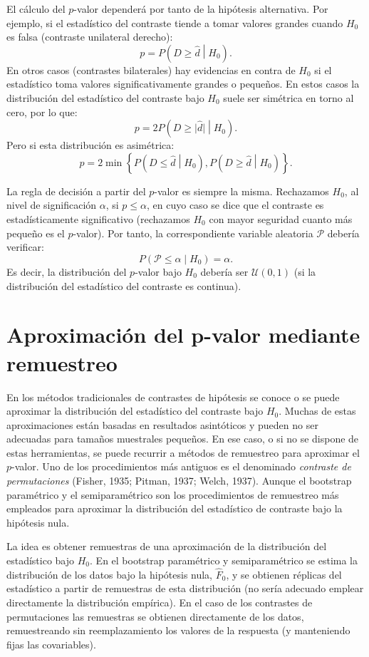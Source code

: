 \documentclass[
]{book}
\theoremstyle{break}
\theoremstyle{nonumberplain}
\begin{document}
El cálculo del \(p\)-valor dependerá por tanto de la hipótesis alternativa.
Por ejemplo, si el estadístico del contraste tiende a tomar valores
grandes cuando \(H_0\) es falsa (contraste unilateral derecho):
\[p = P\left( D \geq \hat{d} \middle| H_0\right).\]
En otros casos (contrastes bilaterales) hay evidencias en contra de
\(H_0\) si el estadístico toma valores significativamente grandes o pequeños.
En estos casos la distribución del estadístico del contraste bajo \(H_0\)
suele ser simétrica en torno al cero, por lo que:
\[p = 2P\left( D \geq \vert \hat{d} \vert \middle| H_0 \right).\]
Pero si esta distribución es asimétrica:
\[p = 2 \min \left\{ P\left( D \leq \hat{d} \middle| H_0 \right),
P\left( D \geq \hat{d} \middle| H_0\right) \right\}.\]

La regla de decisión a partir del \(p\)-valor es siempre la misma.
Rechazamos \(H_0\), al nivel de significación \(\alpha\), si \(p \leq \alpha\),
en cuyo caso se dice que el contraste es estadísticamente significativo
(rechazamos \(H_0\) con mayor seguridad cuanto más pequeño es el \(p\)-valor).
Por tanto, la correspondiente variable aleatoria \(\mathcal{P}\) debería verificar:
\[P\left( \mathcal{P} \leq \alpha \middle| H_0\right)= \alpha.\]
Es decir, la distribución del \(p\)-valor bajo \(H_0\) debería ser \(\mathcal{U}(0,1)\)
(si la distribución del estadístico del contraste es continua).

\section{Aproximación del p-valor mediante remuestreo}\label{aproximaciuxf3n-del-p-valor-mediante-remuestreo}

En los métodos tradicionales de contrastes de hipótesis se conoce o se
puede aproximar la distribución del estadístico del contraste bajo \(H_0\).
Muchas de estas aproximaciones están basadas en resultados asintóticos
y pueden no ser adecuadas para tamaños muestrales pequeños.
En ese caso, o si no se dispone de estas herramientas,
se puede recurrir a métodos de remuestreo para aproximar el \(p\)-valor.
Uno de los procedimientos más antiguos es el denominado
\emph{contraste de permutaciones} (Fisher, 1935; Pitman, 1937; Welch, 1937).
Aunque el bootstrap paramétrico y el semiparamétrico son los
procedimientos de remuestreo más empleados para aproximar
la distribución del estadístico de contraste bajo la hipótesis nula.

La idea es obtener remuestras de una aproximación de la distribución del
estadístico bajo \(H_0\).
En el bootstrap paramétrico y semiparamétrico se estima la distribución
de los datos bajo la hipótesis nula, \(\hat{F}_0\), y se obtienen réplicas del
estadístico a partir de remuestras de esta distribución (no sería adecuado
emplear directamente la distribución empírica).
En el caso de los contrastes de permutaciones las remuestras se obtienen
directamente de los datos, remuestreando sin reemplazamiento los valores
de la respuesta (y manteniendo fijas las covariables).
\end{document}
